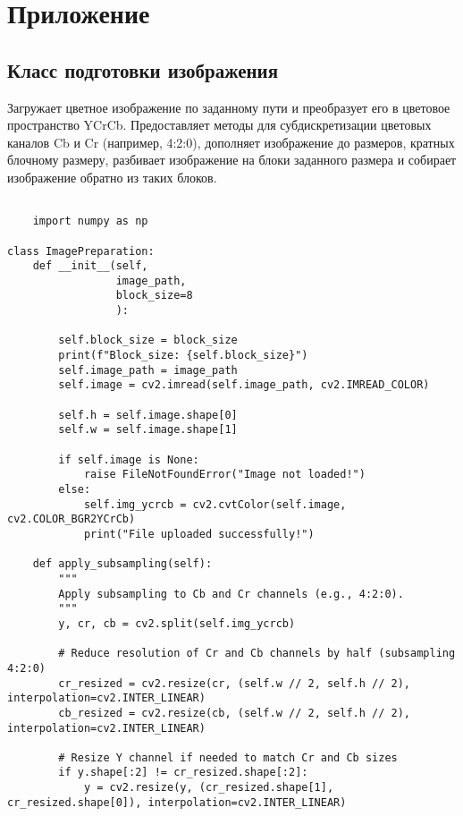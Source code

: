 \newpage
\section{Приложение}

\subsection{Класс подготовки изображения}

Загружает цветное изображение по заданному пути и преобразует его в цветовое пространство YCrCb. 
Предоставляет методы для субдискретизации цветовых каналов Cb и Cr (например, 4:2:0), 
дополняет изображение до размеров, кратных блочному размеру, разбивает изображение на блоки заданного 
размера и собирает изображение обратно из таких блоков.

\begin{lstlisting}[caption={Класс подготовки изображения}]

    import numpy as np

class ImagePreparation:
    def __init__(self,
                 image_path, 
                 block_size=8
                 ):

        self.block_size = block_size
        print(f"Block_size: {self.block_size}")
        self.image_path = image_path
        self.image = cv2.imread(self.image_path, cv2.IMREAD_COLOR)

        self.h = self.image.shape[0]
        self.w = self.image.shape[1]
        
        if self.image is None:
            raise FileNotFoundError("Image not loaded!")
        else:
            self.img_ycrcb = cv2.cvtColor(self.image, cv2.COLOR_BGR2YCrCb)
            print("File uploaded successfully!")

    def apply_subsampling(self):
        """
        Apply subsampling to Cb and Cr channels (e.g., 4:2:0).
        """
        y, cr, cb = cv2.split(self.img_ycrcb)

        # Reduce resolution of Cr and Cb channels by half (subsampling 4:2:0)
        cr_resized = cv2.resize(cr, (self.w // 2, self.h // 2), interpolation=cv2.INTER_LINEAR)
        cb_resized = cv2.resize(cb, (self.w // 2, self.h // 2), interpolation=cv2.INTER_LINEAR)

        # Resize Y channel if needed to match Cr and Cb sizes
        if y.shape[:2] != cr_resized.shape[:2]:
            y = cv2.resize(y, (cr_resized.shape[1], cr_resized.shape[0]), interpolation=cv2.INTER_LINEAR)


\end{lstlisting}
